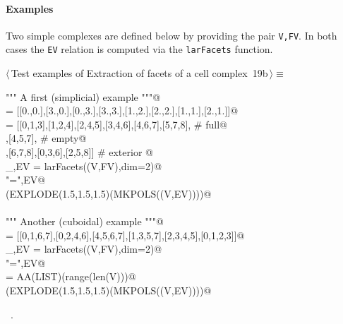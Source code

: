 \documentclass[11pt,oneside]{article}    %
\begin{document}
\paragraph{Examples}
Two simple complexes are defined below by providing the pair \texttt{V,FV}.
In both cases the \texttt{EV} relation is computed via the \texttt{larFacets} function.
\begin{flushleft} \small \label{scrap30}
\protect{}$\langle\,$Test examples of Extraction of facets of a cell complex\nobreak\ {\footnotesize 19b}$\,\rangle\equiv$
\vspace{-1ex}
\begin{list}{}{} \item
\mbox{}\verb@""" A first (simplicial) example """@\\
\mbox{}\verb@V = [[0.,0.],[3.,0.],[0.,3.],[3.,3.],[1.,2.],[2.,2.],[1.,1.],[2.,1.]]@\\
\mbox{}\verb@FV = [[0,1,3],[1,2,4],[2,4,5],[3,4,6],[4,6,7],[5,7,8], # full@\\
\mbox{}\verb@    [1,3,4],[4,5,7], # empty@\\
\mbox{}\verb@    [0,1,2],[6,7,8],[0,3,6],[2,5,8]] # exterior        @\\
\mbox{}\verb@_,EV = larFacets((V,FV),dim=2)@\\
\mbox{}\verb@print "\nEV =",EV@\\
\mbox{}\verb@VIEW(EXPLODE(1.5,1.5,1.5)(MKPOLS((V,EV))))@\\
\mbox{}\verb@@\\
\mbox{}\verb@""" Another (cuboidal) example """@\\
\mbox{}\verb@FV = [[0,1,6,7],[0,2,4,6],[4,5,6,7],[1,3,5,7],[2,3,4,5],[0,1,2,3]]@\\
\mbox{}\verb@_,EV = larFacets((V,FV),dim=2)@\\
\mbox{}\verb@print "\nEV =",EV@\\
\mbox{}\verb@VV = AA(LIST)(range(len(V)))@\\
\mbox{}\verb@VIEW(EXPLODE(1.5,1.5,1.5)(MKPOLS((V,EV))))@\\
\mbox{}\verb@@{\NWsep}
\end{list}
\vspace{-1ex}
\footnotesize\addtolength{\baselineskip}{-1ex}
\begin{list}{}{\setlength{\itemsep}{-\parsep}\setlength{\itemindent}{-\leftmargin}}
\item \NWtxtMacroRefIn\ .
\end{list}
\end{flushleft}
\end{document}
